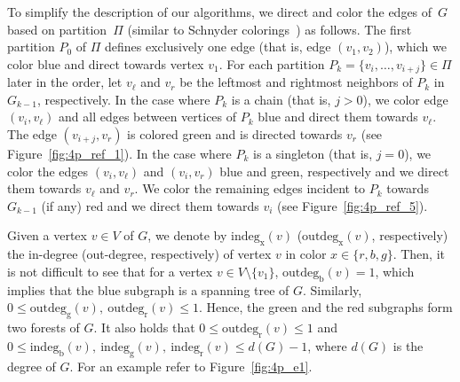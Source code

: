 \documentclass[a4paper,twoside,11pt]{article}
\newcommand{\indeg}[2]{\mathrm{indeg}_{\mathrm{#1}}(#2)}
\newcommand{\outdeg}[2]{\mathrm{outdeg}_{\mathrm{#1}}(#2)}
\begin{document}
To simplify the description of our algorithms, we direct and color
the edges of~$G$ based on partition~$\Pi$ (similar to Schnyder
colorings~\cite{Fe04}) as follows. The first partition $P_0$ of $\Pi$
defines exclusively one edge (that is, edge $(v_1,v_2)$), which we
color blue and direct towards vertex $v_1$. For each partition
$P_k=\{v_i, \ldots, v_{i+j}\} \in \Pi$ later in the order, let
$v_\ell$ and $v_r$ be the leftmost and rightmost neighbors of $P_k$
in $G_{k-1}$, respectively. In the case where $P_k$ is a chain (that
is, $j > 0$), we color edge $(v_i,v_\ell)$ and all edges between
vertices of $P_k$ blue and direct them towards $v_\ell$. The edge
$(v_{i+j},v_r)$ is colored green and is directed towards $v_r$ (see
Figure~\ref{fig:4p_ref_1}). In the case where $P_k$ is a singleton
(that is, $j = 0$), we color the edges $(v_i,v_\ell)$ and
$(v_{i},v_r)$ blue and green, respectively and we direct them towards
$v_\ell$ and $v_r$. We color the remaining edges incident to $P_k$
towards $G_{k-1}$ (if any) red and we direct them towards $v_i$
(see Figure~\ref{fig:4p_ref_5}).

Given a vertex $v \in V$ of $G$, we denote by $\indeg{x}{v}$
($\outdeg{x}{v}$, respectively) the in-degree (out-degree,
respectively) of vertex $v$ in color $x \in \{r,b,g\}$. Then, it is
not difficult to see that for a vertex $v \in V\setminus \{v_1\}$,
$\outdeg{b}{v}=1$, which implies that the blue subgraph is a
spanning tree of $G$. Similarly, $0 \leq
\outdeg{g}{v},~\outdeg{r}{v} \leq 1$. Hence, the green and the red
subgraphs form two forests of $G$. It also holds that $0 \leq
\outdeg{r}{v} \leq 1$ and $0 \leq
\indeg{b}{v},~\indeg{g}{v},~\indeg{r}{v} \leq d(G)-1$, where $d(G)$
is the degree of $G$. For an example refer to
Figure~\ref{fig:4p_e1}.
\end{document}
